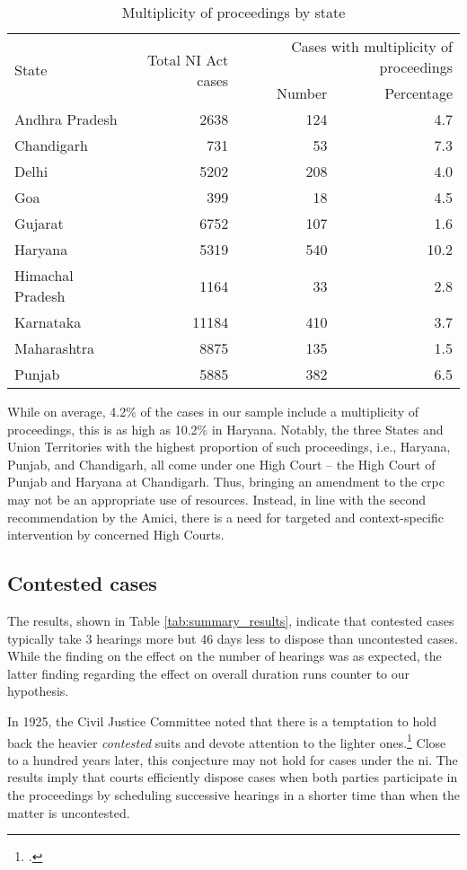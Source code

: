 \begin{longtable}{@{}lrrr@{}}
 \caption{Multiplicity of proceedings by state}\label{tab:state_multiplicity}\\
\toprule
 \multirow{2}{*}{State} & \multirow{2}{*}{Total NI Act cases} & \multicolumn{2}{p{4cm}}{Cases with multiplicity of proceedings} \\
 \cmidrule{3-4}
 & & Number & Percentage \\
\midrule
\endhead
Andhra Pradesh & 2638 & 124 & 4.7 \\
Chandigarh & 731 & 53 & 7.3 \\
Delhi & 5202 & 208 & 4.0 \\
Goa & 399 & 18 & 4.5 \\
Gujarat & 6752 & 107 & 1.6 \\
Haryana & 5319 & 540 & 10.2 \\
Himachal Pradesh & 1164 & 33 & 2.8 \\
Karnataka & 11184 & 410 & 3.7 \\
Maharashtra & 8875 & 135 & 1.5 \\
Punjab & 5885 & 382 & 6.5 \\
\bottomrule
\end{longtable}

While on average, 4.2\% of the cases in our sample include a multiplicity of proceedings, this is as high as 10.2\% in Haryana. Notably, the three States and Union Territories with the highest proportion of such proceedings, i.e., Haryana, Punjab, and Chandigarh, all come under one High Court -- the High Court of Punjab and Haryana at Chandigarh. Thus, bringing an amendment to the \gls{crpc} may not be an appropriate use of resources. Instead, in line with the second recommendation by the Amici, there is a need for targeted and context-specific intervention by concerned High Courts.

\subsection{Contested cases}
\label{sec:contested-cases}

The results, shown in Table \ref{tab:summary_results}, indicate that contested cases typically take 3 hearings more but 46 days less to dispose than uncontested cases. While the finding on the effect on the number of hearings was as expected, the latter finding regarding the effect on overall duration runs counter to our hypothesis.

In 1925, the Civil Justice Committee noted that there is a temptation to hold back the heavier \textit{contested} suits and devote attention to the lighter ones.\footcite{cg1925_civiljustice} Close to a hundred years later, this conjecture may not hold for cases under the \gls{ni}. The results imply that courts efficiently dispose cases when both parties participate in the proceedings by scheduling successive hearings in a shorter time than when the matter is uncontested.

